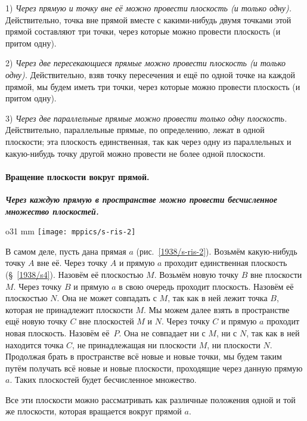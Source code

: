 1) \emph{Через прямую и точку вне её можно провести плоскость (и только одну).} Действительно, точка вне прямой вместе с какими-нибудь двумя точками этой прямой составляют три точки, через которые можно провести плоскость (и притом одну).

2) \emph{Через две пересекающиеся прямые можно провести плоскость (и только одну).} Действительно, взяв точку пересечения и ещё по одной точке на каждой прямой, мы будем иметь три точки, через которые можно провести плоскость (и притом одну).

3) \emph{Через две параллельные прямые можно провести только одну плоскость.} Действительно, параллельные прямые, по определению, лежат в одной плоскости;
эта плоскость единственная, так как через одну из параллельных и какую-нибудь точку другой можно провести не более одной плоскости.


\paragraph{Вращение плоскости вокруг прямой.}\label{1938/s5} 
\textbf{\emph{Через каждую прямую в пространстве можно провести бесчисленное множество плоскостей.}}

\begin{wrapfigure}{o}{31 mm}
\centering
\texttt{[image: mppics/s-ris-2]}
\caption{}\label{1938/s-ris-2}
\end{wrapfigure}

В самом деле, пусть дана прямая $a$ (рис.~\ref{1938/s-ris-2}).
Возьмём какую-нибудь точку $A$ вне её.
Через точку $A$ и прямую $a$ проходит единственная плоскость (§~\ref{1938/s4}).
Назовём её плоскостью $M$.
Возьмём новую точку $B$ вне плоскости $M$.
Через точку $B$ и прямую $a$ в свою очередь проходит плоскость.
Назовём её плоскостью $N$.
Она не может совпадать с $M$, так как в ней лежит точка $B$, которая не принадлежит плоскости $M$.
Мы можем далее взять в пространстве ещё новую точку $C$ вне плоскостей $M$ и $N$.
Через точку $C$ и прямую $a$ проходит новая плоскость.
Назовём её~$P$.
Она не совпадает ни с $M$, ни с $N$, так как в ней находится точка $C$, не принадлежащая ни плоскости $M$, ни плоскости $N$.
Продолжая брать в пространстве всё новые и новые точки, мы будем таким путём получать всё новые и новые плоскости, проходящие через данную прямую $a$.
Таких плоскостей будет бесчисленное множество.

Все эти плоскости можно рассматривать как различные положения одной и той же плоскости, которая вращается вокруг прямой $a$.

